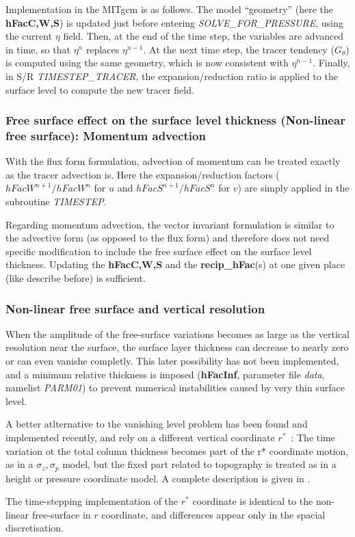 Implementation in the MITgcm is as follows.  The model ``geometry''
(here the {\bf hFacC,W,S}) is updated just before entering {\it
SOLVE\_FOR\_PRESSURE}, using the current $\eta$ field.  Then, at the
end of the time step, the variables are advanced in time, so that
$\eta^n$ replaces $\eta^{n-1}$.  At the next time step, the tracer
tendency ($G_\theta$) is computed using the same geometry, which is
now consistent with $\eta^{n-1}$.  Finally, in S/R {\it
TIMESTEP\_TRACER}, the expansion/reduction ratio is applied to the
surface level to compute the new tracer field.


\subsubsection{Free surface effect on the surface level thickness
(Non-linear free surface): Momentum advection}     
\label{sect:freesurf-momentum-advection}

With the flux form formulation, advection of momentum
can be treated exactly as the tracer advection is.
Here the expansion/reduction factors ($hFacW^{n+1}/hFacW^n$ for $u$
and $hFacS^{n+1}/hFacS^n$ for $v$) are simply applied in the
subroutine {\it TIMESTEP}.

Regarding momentum advection,
the vector invariant formulation is similar to the
advective form (as opposed to the flux form) and therefore
does not need specific modification to include the 
free surface effect on the surface level thickness.
Updating the {\bf hFacC,W,S} and the {\bf recip\_hFac}(s) 
at one given place (like describe before) is sufficient.

\subsubsection{Non-linear free surface and vertical resolution}
\label{sect:nonlin-freesurf-dz_surf}

When the amplitude of the free-surface variations becomes
as large as the vertical resolution near the surface,
the surface layer thickness can decrease to nearly zero or
can even vanishe completly. 
This later possibility has not been implemented, and a 
minimum relative thickness is imposed ({\bf hFacInf}, 
parameter file {\em data}, namelist {\em PARM01}) to prevent 
numerical instabilities caused by very thin surface level.

A better atlternative to the vanishing level problem has been 
found and implemented recently, and rely on a different 
vertical coordinate $r^*$~:
The time variation ot the total column thickness becomes
part of the r* coordinate motion, as in a $\sigma_{z},\sigma_{p}$
model, but the fixed part related to topography is treated
as in a height or pressure coordinate model.
A complete description is given in \cite{adcroft:04}. 

The time-stepping implementation of the $r^*$ coordinate is
identical to the non-linear free-surface in $r$ coordinate,
and differences appear only in the spacial discretisation.


